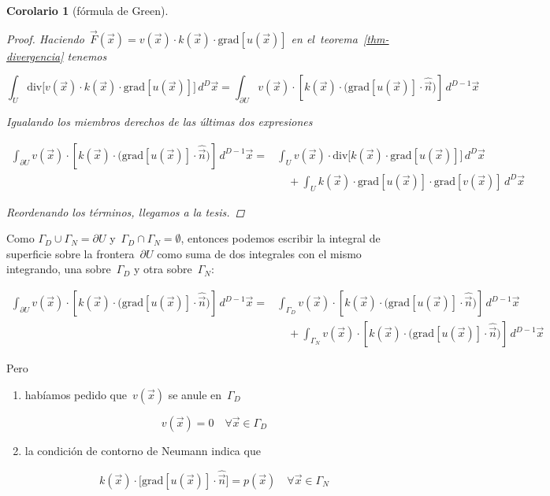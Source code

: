 \documentclass[
  12pt,
  a4paper,
  table]{scrbook}
\theoremstyle{plain}
\theoremstyle{definition}
\theoremstyle{plain}
\theoremstyle{plain}
\newtheorem{corollary}{Corolario}[chapter]
\theoremstyle{remark}
\begin{document}
\begin{corollary}[fórmula de
Green]
\begin{proof}
Haciendo~\(\vec{F}(\vec{x}) = v(\vec{x}) \cdot k(\vec{x}) \cdot \text{grad}\left[ u(\vec{x})\right]\)
en el~teorema~\ref{thm-divergencia} tenemos

\[
\int_U \text{div} \Big[ v(\vec{x}) \cdot k(\vec{x}) \cdot \text{grad}\left[ u(\vec{x})\right] \Big] \, d^D\vec{x} =
\int_{\partial U} v(\vec{x}) \cdot \left[ k(\vec{x}) \cdot \Big( \text{grad}\left[ u(\vec{x}) \right] \cdot \hat{\vec{n}} \Big) \right] \, d^{D-1}\vec{x}
\]

Igualando los miembros derechos de las últimas dos expresiones

\[
\begin{aligned}
\int_{\partial U} v(\vec{x}) \cdot \left[ k(\vec{x}) \cdot \Big( \text{grad}\left[ u(\vec{x}) \right] \cdot \hat{\vec{n}} \Big) \right] \, d^{D-1}\vec{x} =&
\int_U v(\vec{x}) \cdot \text{div}\Big[ k(\vec{x}) \cdot \text{grad}\left[ u(\vec{x})\right] \Big] \, d^D\vec{x} \\
&\quad +
\int_U k(\vec{x}) \cdot \text{grad}\left[u(\vec{x})\right] \cdot \text{grad}\left[v(\vec{x})\right] \, d^D\vec{x}
\end{aligned}
\]

Reordenando los términos, llegamos a la tesis.

\end{proof}

\end{corollary}

Como \(\Gamma_D \cup \Gamma_N = \partial U\)
y~\(\Gamma_D \cap \Gamma_N = \emptyset\), entonces podemos escribir la
integral de superficie sobre la frontera~\(\partial U\) como suma de dos
integrales con el mismo integrando, una sobre~\(\Gamma_D\) y otra
sobre~\(\Gamma_N\):

\[
\begin{aligned}
\int_{\partial U} v(\vec{x}) \cdot \left[ k(\vec{x}) \cdot \Big( \mathrm{grad}\left[ u(\vec{x}) \right] \cdot \hat{\vec{n}} \Big) \right] \, d^{D-1}\vec{x}
=&
\int_{\Gamma_D} v(\vec{x}) \cdot \left[ k(\vec{x}) \cdot \Big( \mathrm{grad}\left[ u(\vec{x}) \right] \cdot \hat{\vec{n}} \Big) \right] \, d^{D-1}\vec{x} \\
&\quad +
\int_{\Gamma_N} v(\vec{x}) \cdot \left[ k(\vec{x}) \cdot \Big( \mathrm{grad}\left[ u(\vec{x}) \right] \cdot \hat{\vec{n}} \Big) \right] \, d^{D-1}\vec{x}
\end{aligned}
\]

Pero

\begin{enumerate}
\def\labelenumi{\roman{enumi}.}
\item
  habíamos pedido que~\(v(\vec{x})\) se anule en~\(\Gamma_D\)

  \[
  v(\vec{x}) = 0 \quad \forall \vec{x} \in \Gamma_D
  \]
\item
  la condición de contorno de Neumann indica que

  \[
  k(\vec{x}) \cdot \Big[ \text{grad} \left[ u(\vec{x}) \right] \cdot \hat{\vec{n}} \Big] = p(\vec{x}) \quad \forall \vec{x} \in \Gamma_N
  \]
\end{enumerate}
\end{document}
